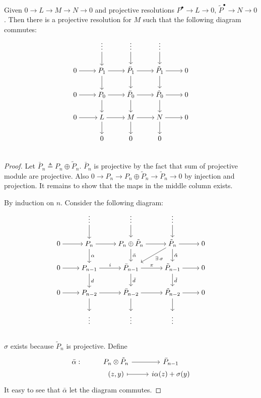 \begin{theorem} \label{thm:horseshoe-lemma}
  Given $0 \to L \to M \to N \to 0$ and projective resolutions
  $P^\bullet \to L \to 0, \, \tilde P^\bullet \to N \to 0$.
  Then there is a projective resolution for $M$ such that
  the following diagram commutes:
  \[ \begin{tikzcd}[cramped]
      & \vdots \ar[d] & \vdots \ar[d] & \vdots \ar[d] & \\
      0 \ar[r] & P_1 \ar[r] \ar[d] & \bar P_1 \ar[r] \ar[d] & \tilde P_1 \ar[r] \ar[d] & 0 \\
      0 \ar[r] & P_0 \ar[r] \ar[d] & \bar P_0 \ar[r] \ar[d] & \tilde P_0 \ar[r] \ar[d] & 0 \\
      0 \ar[r] & L   \ar[r] \ar[d] & M        \ar[r] \ar[d] & N          \ar[r] \ar[d] & 0 \\
      & 0 & 0 & 0 & \\
     \end{tikzcd} \]

   \begin{proof}
    Let $\bar P_n \triangleq P_n \oplus \tilde P_n$. $\bar P_n$ is projective
    by the fact that sum of projective module are projective. Also
    $0 \to P_n \to P_n \oplus \tilde P_n \to \tilde P_n \to 0$ by
    injection and projection. It remains to show that the
    maps in the middle column exists.

    By induction on $n$. Consider the following diagram:
  \[ \begin{tikzcd}[cramped]
      & \vdots \ar[d] & \vdots \ar[d] & \vdots \ar[d] & \\
      0 \ar[r] &
      P_n \ar[r] \ar[d, "\alpha"] &
      P_n \oplus \tilde P_n \ar[r] \ar[d, "\bar \alpha"] &
      \tilde P_n \ar[r] \ar[d, "\tilde \alpha"] \ar[ld, "\exists \sigma"] & 0 \\
      0 \ar[r] &
      P_{n-1} \ar[r, "i"] \ar[d, "d"] &
      \bar P_{n-1} \ar[r, "\pi"] \ar[d, "\bar d"] &
      \tilde P_{n-1} \ar[r] \ar[d, "\tilde d"] & 0 \\
      0 \ar[r] & P_{n-2} \ar[r] \ar[d] &
      \bar P_{n-2} \ar[r] \ar[d] &
      \tilde P_{n-2} \ar[r] \ar[d] & 0 \\
      & \vdots & \vdots & \vdots & \\
     \end{tikzcd} \]
   $\sigma$ exists because $\tilde P_n$ is projective.
   Define
   \[ \begin{tikzcd}[row sep=0pt]
       \bar\alpha : & P_{n} \otimes \tilde P_{n} \ar[r] & \bar P_{n-1} \\
       & (z, y) \ar[r, mapsto] & i \alpha(z) + \sigma(y)
      \end{tikzcd} \]
   It easy to see that $\bar \alpha$ let the diagram commutes.


\end{proof}
\end{theorem}
